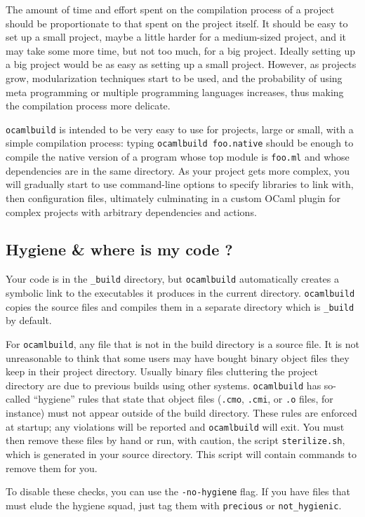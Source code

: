 \documentclass[9pt]{article}
\newcommand{\ocb}{\texttt{ocamlbuild}\xspace}
\begin{document}
The amount of time and effort spent on the compilation process of a project
should be proportionate to that spent on the project itself.  It should be easy
to set up a small project, maybe a little harder for a medium-sized project,
and it may take some more time, but not too much, for a big project.  Ideally
setting up a big project would be as easy as setting up a small project.  However,
as projects grow, modularization techniques start to be used, and the probability
of using meta programming or multiple programming languages increases, thus making
the compilation process more delicate.

\ocb is intended to be very easy to use for projects, large or small, with a simple
compilation process: typing
\texttt{ocamlbuild foo.native} should be enough to compile the native version
of a program whose top module is \texttt{foo.ml} and whose dependencies are in
the same directory.  As your project gets more complex, you will gradually
start to use command-line options to specify libraries to link with, then
configuration files, ultimately culminating in a custom OCaml plugin for
complex projects with arbitrary dependencies and actions.

\subsection{Hygiene \& where is my code ?}
Your code is in the \texttt{\_build} directory, but \ocb automatically creates
a symbolic link to the executables it produces in the current directory.
\ocb copies the source files and compiles them in a separate directory
which is \texttt{\_build} by default.  

For \ocb, any file that is not in the build directory is a source file.
It is not unreasonable to think that some users may have bought binary object files
they keep in their project directory.  Usually binary files cluttering the project
directory are due to previous builds using other systems.  \ocb has so-called
``hygiene'' rules that state that object files (\texttt{.cmo}, \texttt{.cmi},
or \texttt{.o} files, for instance) must not appear outside of the build
directory.  These rules are enforced at startup; any violations will be reported
and \ocb will exit.  You must then remove these files by hand or run, with caution,
the script \texttt{sterilize.sh}, which is generated in your source directory.
This script will contain commands to remove them for you.

To disable these checks, you can use the \texttt{-no-hygiene} flag.  If you have
files that must elude the hygiene squad, just tag them with \texttt{precious}
or \texttt{not\_hygienic}.
\end{document}
